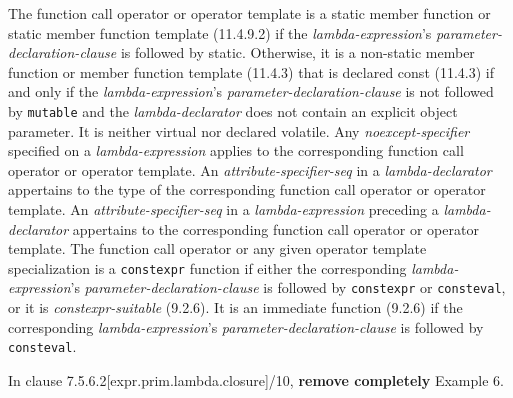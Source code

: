 \begin{modification}
The function call operator or operator template is a static member function or static member function
template (11.4.9.2) if the \emph{lambda-expression}’s
\emph{parameter-declaration-clause} is followed by static. Otherwise,
it is a non-static member function or member function template (11.4.3) that is declared const (11.4.3) if
and only if the \emph{lambda-expression}’s \emph{parameter-declaration-clause}
is not followed by \texttt{mutable} and the \emph{lambda-declarator} does not contain an explicit object parameter. It is neither virtual nor declared volatile.
Any \emph{noexcept-specifier}  specified on a \emph{lambda-expression} applies to the
corresponding function call operator or operator template. An
\emph{attribute-specifier-seq} in a \emph{lambda-declarator}
appertains to the type of the corresponding function call operator or operator
template. An \emph{attribute-specifier-seq} in a \emph{lambda-expression}
preceding a \emph{lambda-declarator} appertains to the corresponding function
call operator or operator template. The function call operator or any given operator template specialization
is a \texttt{constexpr} function if either the corresponding
\emph{lambda-expression}’s \emph{parameter-declaration-clause} is followed
by \texttt{constexpr} or \texttt{consteval}, or it is \emph{constexpr-suitable} (9.2.6). It is an immediate function (9.2.6) if the
corresponding \emph{lambda-expression}’s \emph{parameter-declaration-clause} is
followed by \texttt{consteval}.
\end{modification}

\begin{removal}
\newline

\end{removal}

\begin{noted}
In clause 7.5.6.2[expr.prim.lambda.closure]/10, \textbf{remove completely} Example 6.
\end{noted}

